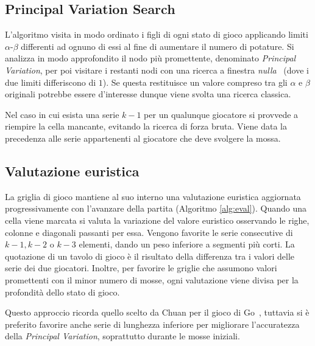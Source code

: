 \documentclass{article}
\begin{document}
\subsection*{Principal Variation Search}

L'algoritmo visita in modo ordinato i figli di ogni stato di gioco applicando
limiti $\alpha$-$\beta$ differenti ad ognuno di essi al fine di aumentare il numero di potature.
Si analizza in modo approfondito il nodo pi\`u promettente, denominato \emph{Principal
Variation}, per poi visitare i restanti nodi con una ricerca a finestra \emph{nulla}~\cite{scout}
(dove i due limiti differiscono di $1$). Se questa restituisce un valore compreso
tra gli $\alpha$ e $\beta$ originali potrebbe essere d'interesse dunque viene
svolta una ricerca classica.

Nel caso in cui esista una serie $k-1$ per un qualunque giocatore si provvede a
riempire la cella mancante, evitando la ricerca di forza bruta. Viene data la
precedenza alle serie appartenenti al giocatore che deve svolgere la mossa.

\subsection*{Valutazione euristica}

La griglia di gioco mantiene al suo interno una valutazione euristica 
aggiornata progressivamente con l'avanzare della partita (Algoritmo \vref{alg:eval}).
Quando una cella viene marcata si valuta la variazione del valore euristico osservando
le righe, colonne e diagonali passanti per essa. Vengono favorite le serie consecutive 
di $k-1, k-2$ o $k-3$ elementi, dando un peso inferiore a segmenti pi\`u corti.
La quotazione di un tavolo di gioco \`e il risultato della differenza tra i
valori delle serie dei due giocatori. Inoltre, per favorire le griglie che
assumono valori promettenti con il minor numero di mosse, ogni
valutazione viene divisa per la profondit\`a dello stato di gioco.

Questo approccio ricorda quello scelto da Chuan per il gioco di Go~\cite{chuan}, %
tuttavia si \`e preferito favorire anche serie di lunghezza inferiore per migliorare 
l'accuratezza della \emph{Principal Variation}, soprattutto durante le mosse iniziali.
\end{document}
